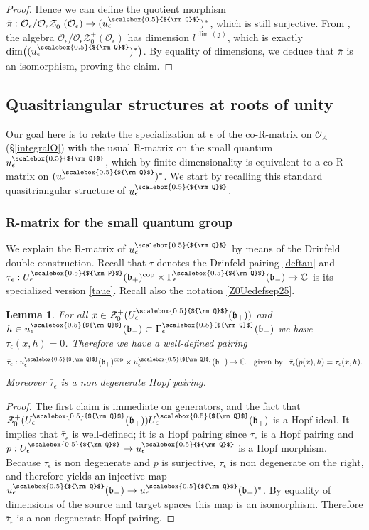 \documentclass[11pt]{amsart}
\newtheorem{lem}[teo]{Lemma}
\newcommand{\e}{\epsilon}
\newcommand{\mc}{\mathbb{C}}
\newcommand{\Oo}{\mathcal{O}}
\newcommand{\Q}{{\scalebox{0.5}{${\rm Q}$}}}
\newcommand{\Pup}{{\scalebox{0.5}{${\rm P}$}}}
\begin{document}
\begin{proof}
Hence we can define the quotient morphism $\bar{\pi}: {\mathcal O}_\e/{\mathcal O}_\epsilon {\mathcal Z}_{0}^+(\Oo_\e) \rightarrow (u_\epsilon^\Q)^*$, which is still surjective. From \cite[\S III.7.7]{BG}, the algebra ${\mathcal O}_\e/{\mathcal O}_\epsilon {\mathcal Z}_{0}^+(\Oo_\e)$ has dimension $l^{\dim(\mathfrak g)}$, which is exactly $\dim\bigl( (u_\e^\Q)^*\bigr)$. By equality of dimensions, we deduce that $\bar{\pi}$ is an isomorphism, proving the claim.
\end{proof}

\subsection{Quasitriangular structures at roots of unity}\label{sec:qtsroot1}

Our goal here is to relate the specialization at $\e$ of the co-R-matrix on $\mathcal{O}_A$ (\S\ref{integralO}) with the usual R-matrix on the small quantum $u_\e^\Q$, which by finite-dimensionality is equivalent to a co-R-matrix on $(u_\e^\Q)^*$. We start by recalling this standard quasitriangular structure of $u_\e^\Q$.


\subsubsection{R-matrix for the small quantum group}\label{subsecRmatSmallQG}
\indent We explain the R-matrix of $u_\e^\Q$ by means of the Drinfeld double construction. Recall that $\tau$ denotes the Drinfeld pairing \eqref{deftau} and $\tau_{\e} : U_\e^\Pup(\mathfrak{b}_+)^{\rm cop}\times \Gamma_\e^\Q(\mathfrak{b}_-)\to \mc$ is its specialized version \eqref{taue}. Recall also the notation \eqref{Z0Uedefsep25}.
\begin{lem}\label{basicqpairingnov24} For all $x\in \mathcal{Z}_0^+(U_\e^\Q(\mathfrak{b}_+))$ and $h\in u_\e^\Q(\mathfrak{b}_-) \subset \Gamma_\e^\Q(\mathfrak{b}_-)$ we have $\tau_{\e}(x,h)=0$. Therefore we have a well-defined pairing
$$\bar{\tau}_{\e} : u_\e^\Q(\mathfrak{b}_+)^{\rm cop}\times u_\e^\Q(\mathfrak{b}_-)\to \mc \quad \text{given by } \:\: \bar{\tau}_{\e}(p(x),h) = \tau_{\e}(x,h).$$
Moreover $\bar{\tau}_{\e}$ is a non degenerate Hopf pairing.
\end{lem}
\begin{proof}
The first claim is immediate on generators, and the fact that $\mathcal{Z}_0^+(U_\e^\Q(\mathfrak{b}_+))U_\e^\Q(\mathfrak{b}_+)$ is a Hopf ideal. It implies that $\bar{\tau}_{\e}$ is well-defined; it is a Hopf pairing since $\tau_{\e}$ is a Hopf pairing and $p : U_\e^\Q \to u_\e^\Q$ is a Hopf morphism. Because $\tau_{\e}$ is non degenerate and $p$ is surjective, $\bar{\tau}_{\e}$ is non degenerate on the right, and therefore yields an injective map $u_\e^\Q(\mathfrak{b}_-) \rightarrow u_\e^\Q(\mathfrak{b}_+)^*$. By equality of dimensions of the source and target spaces this map is an isomorphism. Therefore $\bar{\tau}_{\e}$ is a non degenerate Hopf pairing.
\end{proof}
\end{document}
